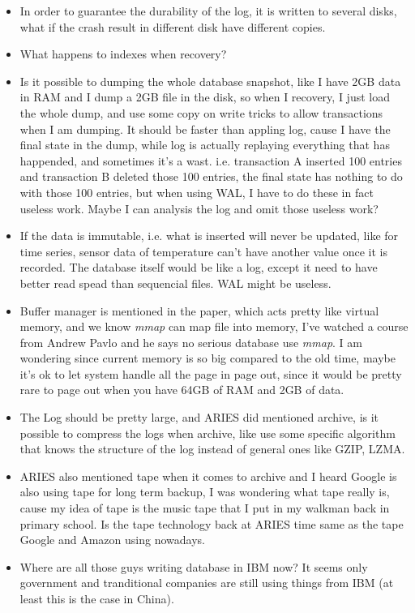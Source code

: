 \documentclass[12pt,a4paper,oneside]{article}
\begin{document}
\begin{itemize}
  \item In order to guarantee the durability of the log, it is written to several disks,
what if the crash result in different disk have different copies.
  \item What happens to indexes when recovery?
  \item Is it possible to dumping the whole database snapshot, like I have
2GB data in RAM and I dump a 2GB file in the disk, so when I recovery, I just load the whole
dump, and use some copy on write tricks to allow transactions when I am dumping. It should
be faster than appling log, cause I have the final state in the dump, while log is actually
replaying everything that has happended, and sometimes it's a wast.
i.e. transaction A inserted 100 entries and transaction B deleted those 100 entries,
the final state has nothing to do with those 100 entries,
but when using WAL, I have to do these in fact useless work.
Maybe I can analysis the log and omit those useless work?
  \item If the data is immutable, i.e. what is inserted will never be updated, like for time series,
sensor data of temperature can't have another value once it is recorded. The database itself would
be like a log, except it need to have better read spead than sequencial files. WAL might be useless.
  \item Buffer manager is mentioned in the paper, which acts pretty like virtual memory,
and we know \textit{mmap} can map file into memory, I've watched a course from Andrew Pavlo
and he says no serious database use \textit{mmap}. I am wondering since current memory is so
big compared to the old time, maybe it's ok to let system handle all the page in page out, since
it would be pretty rare to page out when you have 64GB of RAM and 2GB of data.
  \item The Log should be pretty large, and ARIES did mentioned archive, is it possible to
compress the logs when archive, like use some specific algorithm that knows the structure of
the log instead of general ones like GZIP, LZMA.
  \item ARIES also mentioned tape when it comes to archive and I heard Google is also using tape for long term backup,
I was wondering what tape really is, cause my idea of tape is the music tape that I put in my walkman back in primary school.
Is the tape technology back at ARIES time same as the tape Google and Amazon using nowadays.
  \item Where are all those guys writing database in IBM now? It seems only government and
tranditional companies are still using things from IBM (at least this is the case in China).
\end{itemize}
\end{document}

